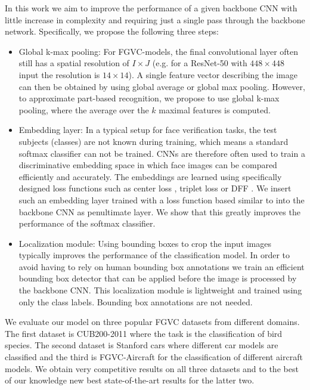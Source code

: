 \documentclass[10pt,twocolumn,letterpaper]{article}
\begin{document}
In this work we aim to improve the performance of a given backbone CNN with little increase in complexity and requiring just a single pass through the backbone network. Specifically, we propose the following three steps:
\begin{itemize}
  \item Global k-max pooling: For FGVC-models, the final convolutional layer often still has a spatial resolution of $I \times J$ (e.g. for a ResNet-50 with $448 \times 448$ input the resolution is $14 \times 14$). A single feature vector describing the image can then be obtained by using global average or global max pooling. However, to approximate part-based recognition, we propose to use global k-max pooling, where the average over the $k$ maximal features is computed.
  \item Embedding layer: In a typical setup for face verification tasks, the test subjects (\ie classes) are not known during training, which means a standard softmax classifier can not be trained. CNNs are therefore often used to train a discriminative embedding space in which face images can be compared efficiently and accurately. The embeddings are learned using specifically designed loss functions such as center loss \cite{wen2016discriminative}, triplet loss \cite{schroff2015facenet} or DFF \cite{hanselmann2017deep}. We insert such an embedding layer trained with a loss function based similar to \cite{hanselmann2017deep} into the backbone CNN as penultimate layer. We show that this greatly improves the performance of the softmax classifier.
  \item Localization module: Using bounding boxes to crop the input images typically improves the performance of the classification model. In order to avoid having to rely on human bounding box annotations we train an efficient bounding box detector that can be applied before the image is processed by the backbone CNN. This localization module is lightweight and trained using only the class labels. Bounding box annotations are not needed.
\end{itemize}

We evaluate our model on three popular FGVC datasets from different domains. The first dataset is CUB200-2011 \cite{birds} where the task is the classification of bird species. The second dataset is Stanford cars \cite{cars} where different car models are classified and the third is FGVC-Aircraft \cite{aircraft} for the classification of different aircraft models. We obtain very competitive results on all three datasets and to the best of our knowledge new best state-of-the-art results for the latter two.
\end{document}
